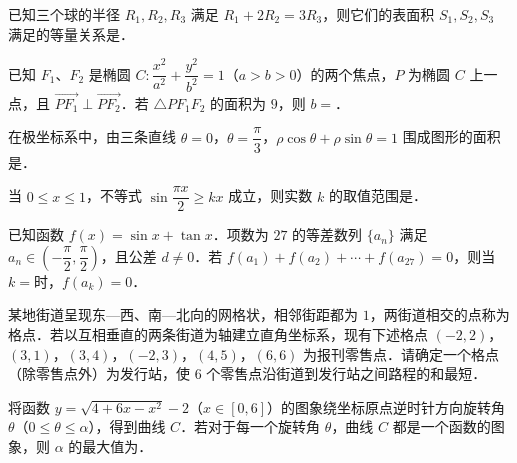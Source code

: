 \begin{question}
已知三个球的半径 $R_1,R_2,R_3$ 满足 $R_1+2R_2=3R_3$，则它们的表面积 $S_1,S_2,S_3$ 满足的等量关系是\gkblank{}．

\end{question}
\begin{question}
已知 $F_1$、$F_2$ 是椭圆 $C:\dfrac{x^2}{a^2}+\dfrac{y^2}{b^2}=1$（$a>b>0$）的两个焦点，$P$ 为椭圆 $C$ 上一点，且 $\overrightarrow{PF_1}\perp\overrightarrow{PF_2}$．若 $\triangle PF_1F_2$ 的面积为 $9$，则 $b=$\gkblank{}．

\end{question}
\begin{question}
在极坐标系中，由三条直线 $\theta=0$，$\theta=\dfrac{\pi}{3}$，$\rho\cos\theta+\rho\sin\theta=1$ 围成图形的面积是\gkblank{}．

\end{question}
\begin{question}
当 $0\leqslant x\leqslant1$，不等式 $\sin\dfrac{\pi x}{2}\geqslant kx$ 成立，则实数 $k$ 的取值范围是\gkblank{}．

\end{question}
\begin{question}
已知函数 $f(x)=\sin x+\tan x$．项数为 $27$ 的等差数列 $\{a_n\}$ 满足 $a_n\in\left(-\dfrac{\pi}{2},\dfrac{\pi}{2}\right)$，且公差 $d\neq0$．若 $f(a_1)+f(a_2)+\cdots+f(a_{27})=0$，则当 $k=$\gkblank{}时，$f(a_k)=0$．

\end{question}
\begin{question}
某地街道呈现东—西、南—北向的网格状，相邻街距都为 $1$，两街道相交的点称为格点．若以互相垂直的两条街道为轴建立直角坐标系，现有下述格点 $(-2,2)$，$(3,1)$，$(3,4)$，$(-2,3)$，$(4,5)$，$(6,6)$ 为报刊零售点．请确定一个格点（除零售点外）\gkblank{}为发行站，使 $6$ 个零售点沿街道到发行站之间路程的和最短．

\end{question}
\begin{question}
将函数 $y=\sqrt{4+6x-x^2}-2$（$x\in[0,6]$）的图象绕坐标原点逆时针方向旋转角 $\theta$（$0\leqslant\theta\leqslant\alpha$），得到曲线 $C$．若对于每一个旋转角 $\theta$，曲线 $C$ 都是一个函数的图象，则 $\alpha$ 的最大值为\gkblank{}．

\end{question}

